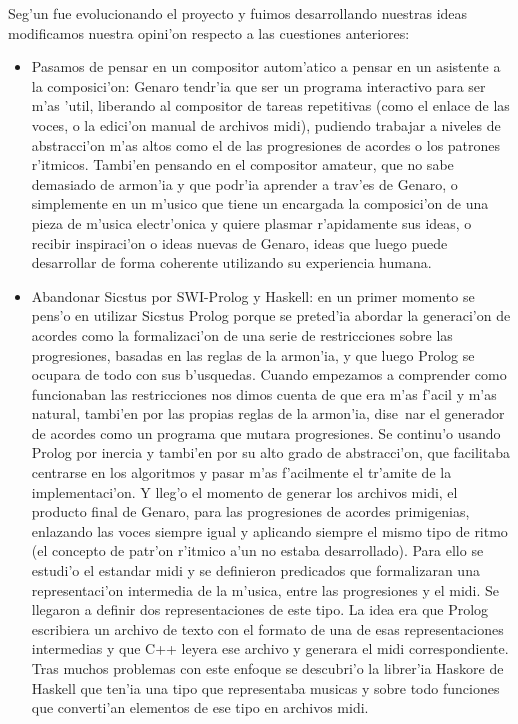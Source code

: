 \documentclass[a4paper,11pt]{article}
\begin{document}
Seg'un fue evolucionando el proyecto y fuimos desarrollando nuestras ideas modificamos nuestra opini'on respecto a las cuestiones anteriores:
        \begin{itemize}
        \item Pasamos de pensar en un compositor autom'atico a pensar en un asistente a la composici'on: Genaro tendr'ia que ser un programa interactivo para ser m'as 'util, liberando al compositor de tareas repetitivas (como el enlace de las voces, o la edici'on manual de archivos midi), pudiendo trabajar a niveles de abstracci'on m'as altos como el de las progresiones de acordes o los patrones r'itmicos. Tambi'en pensando en el compositor amateur, que no sabe demasiado de armon'ia y que podr'ia aprender a trav'es de Genaro, o simplemente en un m'usico que tiene un encargada la composici'on de una pieza de m'usica electr'onica y quiere plasmar r'apidamente sus ideas, o recibir inspiraci'on o ideas nuevas de Genaro, ideas que luego puede desarrollar de forma coherente utilizando su experiencia humana.
        \item Abandonar Sicstus por SWI-Prolog y Haskell: en un primer momento se pens'o en utilizar Sicstus Prolog porque se preted'ia abordar la generaci'on de acordes como la formalizaci'on de una serie de restricciones sobre las progresiones, basadas en las reglas de la armon'ia, y que luego Prolog se ocupara de todo con sus b'usquedas. Cuando empezamos a comprender como funcionaban las restricciones nos dimos cuenta de que era m'as f'acil y m'as natural, tambi'en por las propias reglas de la armon'ia, dise~nar el generador de acordes como un programa que mutara progresiones.
\newline
Se continu'o usando Prolog por inercia y tambi'en por su alto grado de abstracci'on, que facilitaba centrarse en los algoritmos y pasar m'as f'acilmente el tr'amite de la implementaci'on. Y lleg'o el momento de generar los archivos midi, el producto final de Genaro, para las progresiones de acordes primigenias, enlazando las voces siempre igual y aplicando siempre el mismo tipo de ritmo (el concepto de patr'on r'itmico a'un no estaba desarrollado). Para ello se estudi'o el estandar midi y se definieron predicados que formalizaran una representaci'on intermedia de la m'usica, entre las progresiones y el midi. Se llegaron a definir dos representaciones de este tipo. La idea era que Prolog escribiera un archivo de texto con el formato de una de esas representaciones intermedias y que C++ leyera ese archivo y generara el midi correspondiente. Tras muchos problemas con este enfoque se descubri'o la librer'ia Haskore de Haskell que ten'ia una tipo que representaba musicas y sobre todo funciones que converti'an elementos de ese tipo en archivos midi.

\end{itemize}
\end{document}
